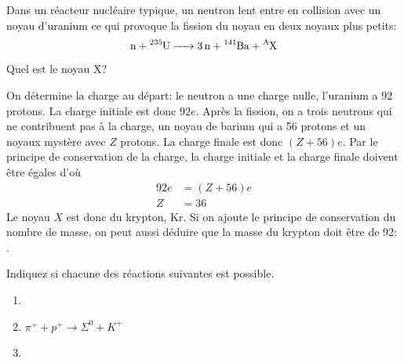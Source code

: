 \begin{diapobox}

  Dans un réacteur nucléaire typique, un neutron lent entre en collision avec
  un noyau d'uranium ce qui provoque la fission du noyau en deux noyaux plus
  petits:
  \[
    \ce{n + ^235U -> 3n + ^141Ba + ^AX}
  \]
  Quel est le noyau X?
\end{diapobox}

\begin{reponsebox}
  On détermine la charge au départ: le neutron a une charge nulle, l'uranium a
  92 protons. La charge initiale est donc $92e$. Après la fission, on a trois
  neutrons qui ne contribuent pas à la charge, un noyau de barium qui a 56
  protons et un noyaux mystère avec $Z$ protons. La charge finale est donc $(Z
  + 56)e$. Par le principe de conservation de la charge, la charge initiale et
  la charge finale doivent être égales d'où
  \begin{align*}
    92e &= (Z + 56)e  \\
      Z &= 36
  \end{align*}
  Le noyau $X$ est donc du krypton, Kr. Si on ajoute le principe de
  conservation du nombre de masse, on peut aussi déduire que la masse du
  krypton doit être de 92: .
  \vspace{-1mm}
\end{reponsebox}


\begin{diapobox}

  Indiquez si chacune des réactions suivantes est possible.
  \begin{enumerate}
    \item {}
    \item $\pi^+ + p^+ \longrightarrow \Sigma^0 + K^+$
    \item {}
  \end{enumerate}
\end{diapobox}


